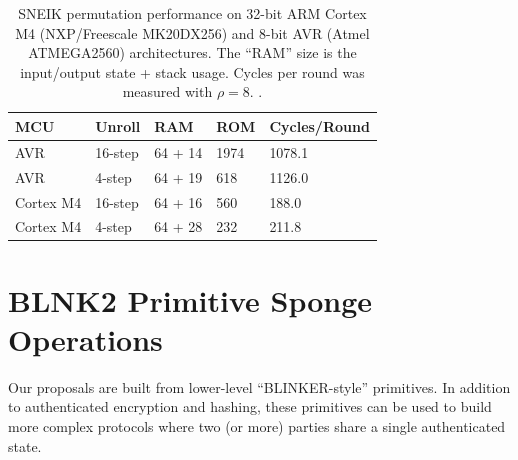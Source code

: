 \documentclass{iacrtrans}
\begin{document}
	\begin{table}
	\caption{SNEIK permutation performance on 32-bit ARM Cortex M4 
		(NXP/Freescale MK20DX256) and 8-bit AVR (Atmel ATMEGA2560) 
		architectures. The ``RAM'' size is the input/output state +
		stack usage. Cycles per round was measured with
		$\rho=8$. \label{tab:mcuspeed}. 
	}
	\begin{center}
	\begin{tabular}{l l l l l}
		{\bf MCU} & {\bf Unroll} & {\bf RAM} & {\bf ROM} & {\bf Cycles/Round} \\
		\hline
		AVR			& 16-step	 & 64 + 14	& 1974 	& 1078.1 \\
		AVR			& 4-step 	 & 64 + 19	& 618  	& 1126.0 \\
		Cortex M4 	& 16-step 	 & 64 + 16	& 560	& 188.0 \\
		Cortex M4 	& 4-step 	 & 64 + 28	& 232  	& 211.8
	\end{tabular}
	\end{center}
	\end{table}

\newpage
\section{BLNK2 Primitive Sponge Operations}
\label{sec:blnk}

	Our proposals are built from lower-level ``BLINKER-style'' 
	\cite{DBLP:conf/ctrsa/Saarinen14a} primitives. In addition to 
	authenticated encryption and hashing, these primitives can be used to 
	build more complex protocols where two (or more) parties share a 
	single authenticated state. 
\end{document}
